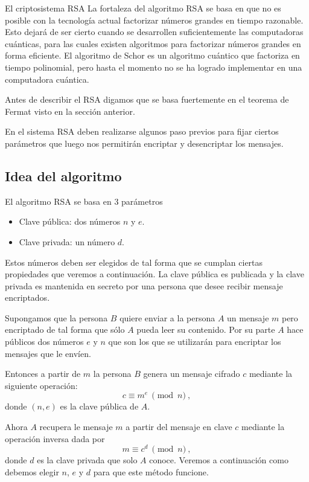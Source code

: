 \begin{section}{El criptosistema RSA}
La fortaleza del algoritmo RSA se basa en que no es posible  con la tecnología actual factorizar números grandes en tiempo razonable. Esto dejará de ser cierto cuando se desarrollen suficientemente las computadoras cuánticas, para las cuales existen algoritmos para factorizar números grandes en forma eficiente. El algoritmo de Schor es un algoritmo cuántico que factoriza en tiempo polinomial, pero hasta el momento no se ha logrado implementar en una computadora cuántica.


Antes de describir el RSA digamos que se basa fuertemente en el teorema de Fermat visto en la sección anterior. 


En el sistema RSA deben realizarse algunos paso previos para fijar ciertos parámetros que luego nos permitirán encriptar y desencriptar los mensajes.



\subsection*{Idea del  algoritmo}

El algoritmo RSA se basa en $3$ parámetros
\begin{itemize}
    \item Clave pública: dos números $n$ y $e$.
    \item Clave privada: un número $d$.
\end{itemize}
Estos números deben ser elegidos de tal forma que se cumplan ciertas propiedades que veremos a continuación. La clave pública es publicada y la clave privada es mantenida en secreto por una persona que desee recibir mensaje encriptados.

Supongamos que la persona $B$  quiere enviar a la persona $A$ un mensaje $m$ pero encriptado de tal forma que sólo $A$ pueda leer su contenido. Por su parte $A$ hace públicos dos números $e$ y $n$ que son los que se utilizarán para encriptar los mensajes que le envíen. 

Entonces a partir de $m$ la persona $B$ genera un mensaje cifrado $c$ mediante la siguiente operación:
$$
    c\equiv m^e\ \pmod{n}\ ,
$$
donde $(n, e)$ es la clave pública de $A$.

Ahora $A$ recupera le mensaje $m$ a partir del mensaje en clave $c$ mediante la operación inversa dada por
$$
    m\equiv c^d\ \pmod{n}\ ,
$$
donde $d$ es la clave privada que solo $A$ conoce. Veremos a continuación como debemos elegir $n$, $e$ y $d$ para que este método funcione.




\end{section}
